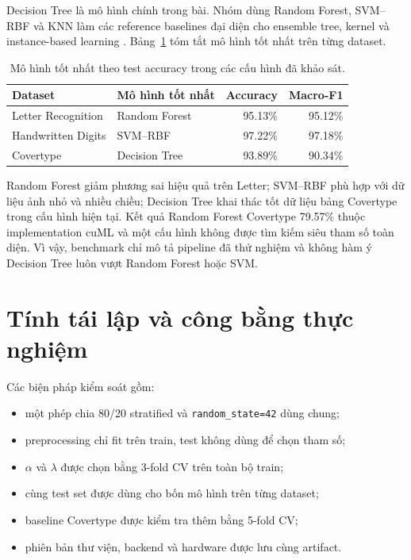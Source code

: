 Decision Tree là mô hình chính trong bài. Nhóm dùng Random Forest, SVM--RBF và KNN làm các reference baselines đại diện cho ensemble tree, kernel và instance-based learning \cite{breiman2001rf,cortes1995svm,cover1967knn}. Bảng~\ref{tab:best-models} tóm tắt mô hình tốt nhất trên từng dataset.

\begin{table}[H]
    \centering
    \small
    \caption[Mô hình tốt nhất trên từng bộ dữ liệu]{Mô hình tốt nhất theo test accuracy trong các cấu hình đã khảo sát.}
    \label{tab:best-models}
    \begin{tabular}{@{}llrr@{}}
        \toprule
        \textbf{Dataset} & \textbf{Mô hình tốt nhất} & \textbf{Accuracy} & \textbf{Macro-F1} \\
        \midrule
        Letter Recognition & Random Forest & 95.13\% & 95.12\% \\
        Handwritten Digits & SVM--RBF & 97.22\% & 97.18\% \\
        Covertype & Decision Tree & 93.89\% & 90.34\% \\
        \bottomrule
    \end{tabular}
\end{table}

Random Forest giảm phương sai hiệu quả trên Letter; SVM--RBF phù hợp với dữ liệu ảnh nhỏ và nhiều chiều; Decision Tree khai thác tốt dữ liệu bảng Covertype trong cấu hình hiện tại. Kết quả Random Forest Covertype 79.57\% thuộc implementation cuML và một cấu hình không được tìm kiếm siêu tham số toàn diện. Vì vậy, benchmark chỉ mô tả pipeline đã thử nghiệm và không hàm ý Decision Tree luôn vượt Random Forest hoặc SVM.

\section{Tính tái lập và công bằng thực nghiệm}

Các biện pháp kiểm soát gồm:

\begin{itemize}
    \item một phép chia 80/20 stratified và \texttt{random\_state=42} dùng chung;
    \item preprocessing chỉ fit trên train, test không dùng để chọn tham số;
    \item $\alpha$ và $\lambda$ được chọn bằng 3-fold CV trên toàn bộ train;
    \item cùng test set được dùng cho bốn mô hình trên từng dataset;
    \item baseline Covertype được kiểm tra thêm bằng 5-fold CV;
    \item phiên bản thư viện, backend và hardware được lưu cùng artifact.
\end{itemize}

